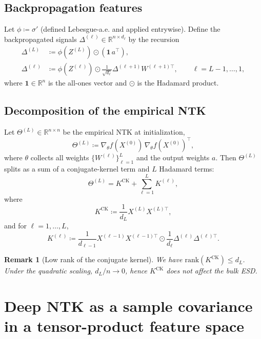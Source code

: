 \documentclass[11pt]{article}
\newcommand{\RR}{\mathbb{R}}
\newtheorem{remark}{Remark}
\begin{document}
\subsection{Backpropagation features}
Let $\phi\coloneqq \sigma'$ (defined Lebesgue-a.e. and applied entrywise).
Define the backpropagated signals $\Delta^{(\ell)}\in\RR^{n\times d_\ell}$ by the recursion
\begin{align}
  \Delta^{(L)} &\coloneqq \phi(Z^{(L)})\odot (\mathbf{1}\, a^\top),\label{eq:delta-last}\\
  \Delta^{(\ell)} &\coloneqq \phi(Z^{(\ell)})\odot \frac{1}{\sqrt{d_\ell}}\Delta^{(\ell+1)}W^{(\ell+1)\top},
  \qquad \ell=L-1,\dots,1,\label{eq:delta-rec}
\end{align}
where $\mathbf{1}\in\RR^{n}$ is the all-ones vector and $\odot$ is the Hadamard product.

\subsection{Decomposition of the empirical NTK}
Let $\Theta^{(L)}\in\RR^{n\times n}$ be the empirical NTK at initialization,
\[
  \Theta^{(L)}\coloneqq \nabla_\theta f(X^{(0)})\,\nabla_\theta f(X^{(0)})^\top,
\]
where $\theta$ collects all weights $\{W^{(\ell)}\}_{\ell=1}^L$ and the output weights $a$.
Then $\Theta^{(L)}$ splits as a sum of a conjugate-kernel term and $L$ Hadamard terms:
\begin{equation}\label{eq:ntk-decomp}
  \Theta^{(L)} = K^{\mathrm{CK}} + \sum_{\ell=1}^L K^{(\ell)},
\end{equation}
where
\begin{equation}\label{eq:ck-def}
  K^{\mathrm{CK}}\coloneqq \frac{1}{d_L}X^{(L)}X^{(L)\top},
\end{equation}
and for $\ell=1,\dots,L$,
\begin{equation}\label{eq:layer-def}
  K^{(\ell)} \coloneqq
  \frac{1}{d_{\ell-1}}X^{(\ell-1)}X^{(\ell-1)\top}
  \odot
  \frac{1}{d_\ell}\Delta^{(\ell)}\Delta^{(\ell)\top}.
\end{equation}

\begin{remark}[Low rank of the conjugate kernel]
We have $\mathrm{rank}(K^{\mathrm{CK}})\leq d_L$.
Under the quadratic scaling, $d_L/n\to 0$, hence $K^{\mathrm{CK}}$ does not affect the bulk ESD.
\end{remark}

\section{Deep NTK as a sample covariance in a tensor-product feature space}
\label{sec:deep-gram}
\end{document}

